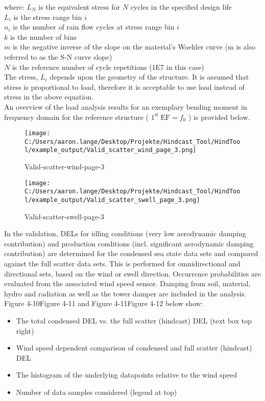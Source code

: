 where:
\quad $ L_{N} $ \quad is the equivalent stress for $N$ cycles in the specified design life\\
\quad $ L_{i} $ \quad is the stress range bin $i$\\
\quad $ n_{i} $ \quad is the number of rain flow cycles at stress range bin $i$\\
\quad $ k $ \quad  is the number of bins\\
\quad $ m $ \quad  is the negative inverse of the slope on the material's Woehler curve (m is also referred to as the S-N curve slope) \\
\quad $ N $ \quad  is the reference number of cycle repetitions (1E7 in this case) \\

The stress, $L_{i}$ depends upon the geometry of the structure. It is assumed that stress is proportional to load, therefore it is acceptable to use load instead of stress in the above equation.
\\
An overview of the load analysis results for an exemplary bending moment in frequency domain for the reference structure ( $1^{\text {st }} \mathrm{EF}=f_{0}$ ) is provided below.\\

\begin{figure}[H] 
 \centering 
 \texttt{[image: C:/Users/aaron.lange/Desktop/Projekte/Hindcast\_Tool/HindTool/example\_output/Valid\_scatter\_wind\_page\_3.png]} 
 \caption{ Valid-scatter-wind-page-3 } 
 \label{fig: Valid_scatter_wind_page_3 } 
\end{figure}
\begin{figure}[H] 
 \centering 
 \texttt{[image: C:/Users/aaron.lange/Desktop/Projekte/Hindcast\_Tool/HindTool/example\_output/Valid\_scatter\_swell\_page\_3.png]} 
 \caption{ Valid-scatter-swell-page-3 } 
 \label{fig: Valid_scatter_swell_page_3 } 
\end{figure}


In the validation, DELs for idling conditions (very low aerodynamic damping contribution) and production conditions (incl. significant aerodynamic damping contribution) are determined for the condensed sea state data sets and compared against the full scatter data sets. This is performed for omnidirectional and directional sets, based on the wind or swell direction. Occurrence probabilities are evaluated from the associated wind speed sensor. Damping from soil, material, hydro and radiation as well as the tower damper are included in the analysis.
\\
Figure 4-10Figure 4-11 and Figure 4-11Figure 4-12 below show:
\begin{itemize}
	\item The total condensed DEL vs. the full scatter (hindcast) DEL (text box top right)
	\item Wind speed dependent comparison of condensed and full scatter (hindcast) DEL
	\item The histogram of the underlying datapoints relative to the wind speed
	\item Number of data samples considered (legend at top)
\end{itemize}

